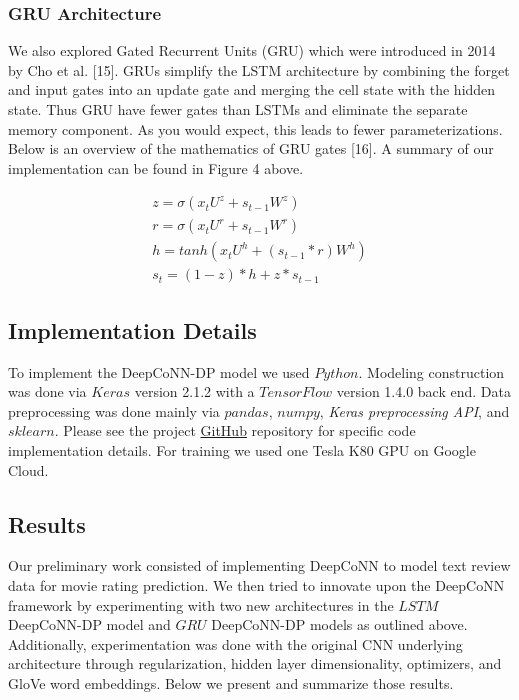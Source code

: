\documentclass[10pt, twocolumn, letterpaper]{article}
\begin{document}
\subsubsection{GRU Architecture}
We also explored Gated Recurrent Units (GRU) which were introduced in 2014 by Cho et al. [15]. GRUs simplify the LSTM architecture by combining the forget and input gates into an update gate and merging the cell state with the
hidden state. Thus GRU have fewer gates than LSTMs and eliminate the separate memory component. As you would expect, this leads to fewer parameterizations. Below is an overview of the mathematics of GRU gates [16]. A summary of our implementation can be found in Figure 4 above.

\begin{center}
\begin{gather}
z = \sigma(x_t U^z + s_{t-1}W^z) \\
r = \sigma(x_t U^r + s_{t-1}W^r) \\
h = tanh(x_t U^h + (s_{t-1} * r) W^h) \\
s_t = (1-z) * h + z * s_{t-1}
\end{gather}
\end{center}


\subsection{Implementation Details}

To implement the DeepCoNN-DP model we used $Python$. Modeling construction was done via $Keras$ version 2.1.2 with a $TensorFlow$ version 1.4.0 back end. Data preprocessing was done mainly via $pandas$, $numpy$, \textit{Keras preprocessing API}, and $sklearn$. Please see the project \href{https://github.com/michaelAlvarino/Deep-Learning}{GitHub} repository for specific code implementation details. For training we used one Tesla K80 GPU on Google Cloud.

\subsection{Results}

Our preliminary work consisted of implementing DeepCoNN to model text review data for movie rating prediction. We then tried to innovate upon the DeepCoNN framework by experimenting with two new architectures in the $LSTM$ DeepCoNN-DP model and $GRU$ DeepCoNN-DP models as outlined above. Additionally, experimentation was done with the original CNN underlying architecture through regularization, hidden layer dimensionality, optimizers, and GloVe word embeddings. Below we present and summarize those results.
\end{document}
